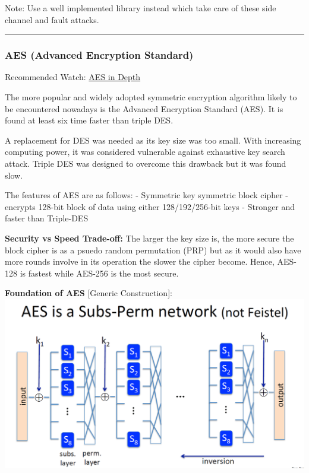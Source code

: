 \documentclass[11pt]{article}
\makeatletter
\def\maxwidth{\ifdim\Gin@nat@width>\linewidth\linewidth
    \else\Gin@nat@width\fi}
\let\Oldincludegraphics\includegraphics
\renewcommand{\includegraphics}[1]{\Oldincludegraphics[width=.8\maxwidth]{#1}}
\makeatother
\begin{document}
Note: Use a well implemented library instead which take care of these
side channel and fault attacks.

\begin{center}\rule{0.5\linewidth}{\linethickness}\end{center}

    \hypertarget{aes-advanced-encryption-standard}{%
\subsubsection{AES (Advanced Encryption
Standard)}\label{aes-advanced-encryption-standard}}

Recommended Watch:
\href{https://www.coursera.org/learn/crypto/lecture/cHOMl/the-aes-block-cipher}{AES
in Depth}

The more popular and widely adopted symmetric encryption algorithm
likely to be encountered nowadays is the Advanced Encryption Standard
(AES). It is found at least six time faster than triple DES.

A replacement for DES was needed as its key size was too small. With
increasing computing power, it was considered vulnerable against
exhaustive key search attack. Triple DES was designed to overcome this
drawback but it was found slow.

The features of AES are as follows: - Symmetric key symmetric block
cipher - encrypts 128-bit block of data using either 128/192/256-bit
keys - Stronger and faster than Triple-DES

\textbf{Security vs Speed Trade-off:} The larger the key size is, the
more secure the block cipher is as a psuedo random permutation (PRP) but
as it would also have more rounds involve in its operation the slower
the cipher become. Hence, AES-128 is fastest while AES-256 is the most
secure.

\textbf{Foundation of AES} {[}Generic Construction{]}:
\includegraphics{./Images/AES-Generic.png}
\end{document}
